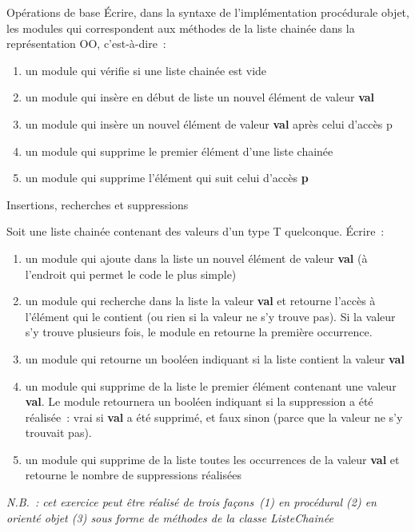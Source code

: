 	\begin{Exercice}{Opérations de base}
		Écrire, dans la syntaxe de l'implémentation procédurale objet, 
		les modules qui correspondent aux méthodes de la liste 
		chainée dans la représentation OO, c'est-à-dire~:

		\begin{enumerate}
			\item {
				un module qui vérifie si une liste chainée est vide}
			\item {
				un module qui insère en début de liste un nouvel élément de valeur \textbf{val}}
			\item {
				un module qui insère un nouvel élément de valeur \textbf{val} après celui d'accès p}
			\item {
				un module qui supprime le premier élément d'une liste chainée}
			\item {
				un module qui supprime l'élément qui suit celui d'accès \textbf{p}}
		\end{enumerate}
	\end{Exercice}
	
	\begin{Exercice}{Insertions, recherches et suppressions}
		
		Soit une liste chainée contenant des valeurs d'un type T quelconque. Écrire~:

		\begin{enumerate}
			\item {
				un module qui ajoute dans la liste un nouvel élément de valeur 
				\textbf{val} (à l'endroit qui permet le code le plus simple)}
			\item {
				un module qui recherche dans la liste la valeur \textbf{val} 
				et retourne l'accès à l'élément qui le contient (ou rien si
				la valeur ne s'y trouve pas). Si la valeur s'y trouve plusieurs 
				fois, le module en retourne la première occurrence.}
			\item {
				un module qui retourne un booléen indiquant si la liste 
				contient la valeur \textbf{val}}
			\item {
				un module qui supprime de la liste le premier élément contenant 
				une valeur \textbf{val}. Le module retournera un booléen
				indiquant si la suppression a été réalisée~: vrai si \textbf{val} 
				a été supprimé, et faux sinon (parce que la valeur ne
				s'y trouvait pas).}
			\item {
				un module qui supprime de la liste toutes les occurrences de la valeur 
				\textbf{val} et retourne le nombre de suppressions réalisées}
		\end{enumerate}
		
		{\itshape
		N.B.~: cet exercice peut être réalisé de trois façons~(1) en procédural 
		(2) en orienté objet (3) sous forme de méthodes de la classe ListeChainée}
	\end{Exercice}

